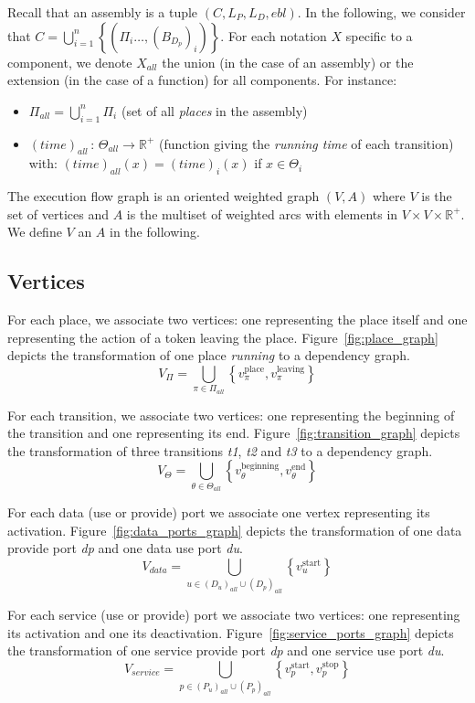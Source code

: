 Recall that an assembly is a tuple $\left(C,L_{P},L_{D},ebl\right)$. In
the following, we consider that
$C=\bigcup_{i=1}^{n}\left\{ \left(\Pi_{i}\dots,\left(B_{D_{p}}\right)_{i}\right)\right\} $.
For each notation $X$ specific to a component, we denote $X_{all}$ the
union (in the case of an assembly) or the extension (in the case of
a function) for all components. For instance:
\begin{itemize}
\item $\Pi_{all}=\bigcup_{i=1}^{n}\Pi_{i}$ (set of all \emph{places} in
the assembly)
\item $\left(time\right)_{all}\,:\,\Theta_{all}\rightarrow\mathbb{R}^{+}$
(function giving the \emph{running time} of each transition) with:
$\left(time\right)_{all}\left(x\right)=\left(time\right)_{i}\left(x\right)$
if $x\in\Theta_{i}$ 
\end{itemize}
The execution flow graph is an oriented weighted graph \emph{$\left(V,A\right)$}
where $V$ is the set of vertices and $A$ is the multiset of weighted
arcs with elements in $V\times V\times\mathbb{R}^{+}$. We define
$V$ an $A$ in the following.

\subsection{Vertices}

For each place, we associate two vertices: one representing the place
itself and one representing the action of a token leaving the place.
Figure~\ref{fig:place_graph} depicts the transformation of one place
\emph{running} to a dependency graph.
\[
V_{\Pi}=\bigcup_{\pi\in\Pi_{all}}\left\{ v_\pi^\text{place},v_\pi^\text{leaving}\right\} 
\]

For each transition, we associate two vertices: one representing the
beginning of the transition and one representing its end.
Figure~\ref{fig:transition_graph} depicts the transformation of three
transitions \emph{t1}, \emph{t2} and \emph{t3} to a dependency graph.
\[
V_{\Theta}=\bigcup_{\theta\in\Theta_{all}}\left\{ v_\theta^\text{beginning},v_\theta^\text{end}\right\} 
\]

For each data (use or provide) port we associate one vertex representing
its activation.
Figure~\ref{fig:data_ports_graph} depicts the transformation of one
data provide port \emph{dp} and one data use port \emph{du}.
\[
V_{data}=\bigcup_{u\in\left(D_{u}\right)_{all}\cup\left(D_{p}\right)_{all}}\left\{ v_u^\text{start}\right\} 
\]

For each service (use or provide) port we associate two vertices:
one representing its activation and one its deactivation.
Figure~\ref{fig:service_ports_graph} depicts the transformation of one
service provide port \emph{dp} and one service use port \emph{du}.
\[
V_{service}=\bigcup_{p\in\left(P_{u}\right)_{all}\cup\left(P_{p}\right)_{all}}\left\{v_p^\text{start},v_p^\text{stop}\right\} 
\]

